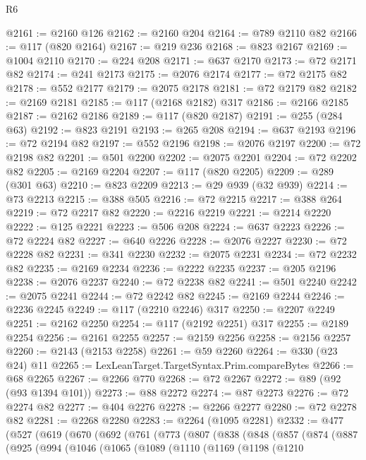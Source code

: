 \begin{lexlean}{R6}
\begin{coremodule}
@2161 := @2160 @126
@2162 := @2160 @204
@2164 := @789 @2110 @82
@2166 := @117 (@820 @2164)
@2167 := @219 @236
@2168 := @823 @2167
@2169 := @1004 @2110
@2170 := @224 @208
@2171 := @637 @2170
@2173 := @72 @2171 @82
@2174 := @241 @2173
@2175 := @2076 @2174
@2177 := @72 @2175 @82
@2178 := @552 @2177
@2179 := @2075 @2178
@2181 := @72 @2179 @82
@2182 := @2169 @2181
@2185 := @117 (@2168 @2182) @317
@2186 := @2166 @2185
@2187 := @2162 @2186
@2189 := @117 (@820 @2187)
@2191 := @255 (@284 @63)
@2192 := @823 @2191
@2193 := @265 @208
@2194 := @637 @2193
@2196 := @72 @2194 @82
@2197 := @552 @2196
@2198 := @2076 @2197
@2200 := @72 @2198 @82
@2201 := @501 @2200
@2202 := @2075 @2201
@2204 := @72 @2202 @82
@2205 := @2169 @2204
@2207 := @117 (@820 @2205)
@2209 := @289 (@301 @63)
@2210 := @823 @2209
@2213 := @29 @939 (@32 @939)
@2214 := @73 @2213
@2215 := @388 @505
@2216 := @72 @2215
@2217 := @388 @264
@2219 := @72 @2217 @82
@2220 := @2216 @2219
@2221 := @2214 @2220
@2222 := @125 @2221
@2223 := @506 @208
@2224 := @637 @2223
@2226 := @72 @2224 @82
@2227 := @640 @2226
@2228 := @2076 @2227
@2230 := @72 @2228 @82
@2231 := @341 @2230
@2232 := @2075 @2231
@2234 := @72 @2232 @82
@2235 := @2169 @2234
@2236 := @2222 @2235
@2237 := @205 @2196
@2238 := @2076 @2237
@2240 := @72 @2238 @82
@2241 := @501 @2240
@2242 := @2075 @2241
@2244 := @72 @2242 @82
@2245 := @2169 @2244
@2246 := @2236 @2245
@2249 := @117 (@2210 @2246) @317
@2250 := @2207 @2249
@2251 := @2162 @2250
@2254 := @117 (@2192 @2251) @317
@2255 := @2189 @2254
@2256 := @2161 @2255
@2257 := @2159 @2256
@2258 := @2156 @2257
@2260 := @2143 (@2153 @2258)
@2261 := @59 @2260
@2264 := @330 (@23 @24) @11
@2265 := LexLeanTarget.TargetSyntax.Prim.compareBytes
@2266 := @68 @2265
@2267 := @2266 @770
@2268 := @72 @2267
@2272 := @89 (@92 (@93 @1394 @101))
@2273 := @88 @2272
@2274 := @87 @2273
@2276 := @72 @2274 @82
@2277 := @404 @2276
@2278 := @2266 @2277
@2280 := @72 @2278 @82
@2281 := @2268 @2280
@2283 := @2264 (@1095 @2281)
@2332 := @477
    (@527
      (@619
        (@670
          (@692
            (@761
              (@773
                (@807
                  (@838
                    (@848
                      (@857
                        (@874
                          (@887
                            (@925
                              (@994
                                (@1046
                                  (@1065
                                    (@1089
                                      (@1110
                                        (@1169
                                          (@1198
                                            (@1210

\end{coremodule}
\end{lexlean}
